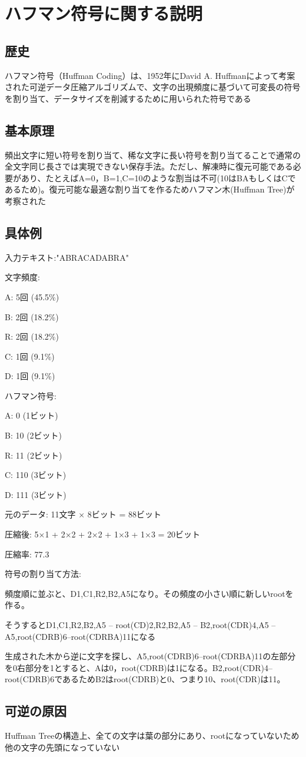 \section{ハフマン符号に関する説明}
\subsection{歴史}
    \label{sec:Sec1Implementation}
ハフマン符号（Huffman Coding）は、1952年にDavid A. Huffmanによって考案された可逆データ圧縮アルゴリズムで、文字の出現頻度に基づいて可変長の符号を割り当て、データサイズを削減するために用いられた符号である
\subsection{基本原理}
頻出文字に短い符号を割り当て、稀な文字に長い符号を割り当てることで通常の全文字同じ長さでは実現できない保存手法。ただし、解凍時に復元可能である必要があり、たとえばA=0，B=1,C=10のような割当は不可(10はBAもしくはCであるため)。復元可能な最適な割り当てを作るためハフマン木(Huffman Tree)が考察された
\subsection{具体例}

入力テキスト:"ABRACADABRA"

文字頻度:

A: 5回 (45.5\%)

B: 2回 (18.2\%) 

R: 2回 (18.2\%)

C: 1回 (9.1\%)

D: 1回 (9.1\%)

ハフマン符号:

A: 0     (1ビット)

B: 10    (2ビット)

R: 11    (2ビット)

C: 110   (3ビット)

D: 111   (3ビット)

元のデータ: 11文字 × 8ビット = 88ビット

圧縮後: 5×1 + 2×2 + 2×2 + 1×3 + 1×3 = 20ビット

圧縮率: 77.3%


符号の割り当て方法:

頻度順に並ぶと、D1,C1,R2,B2,A5になり。その頻度の小さい順に新しいrootを作る。

そうするとD1,C1,R2,B2,A5 -- root(CD)2,R2,B2,A5 -- B2,root(CDR)4,A5 -- A5,root(CDRB)6--root(CDRBA)11になる

生成された木から逆に文字を探し、A5,root(CDRB)6--root(CDRBA)11の左部分を0右部分を1とすると、Aは0，root(CDRB)は1になる。B2,root(CDR)4--root(CDRB)6であるためB2はroot(CDRB)と0、つまり10、root(CDR)は11。

\subsection{可逆の原因}
Huffman Treeの構造上、全ての文字は葉の部分にあり、rootになっていないため他の文字の先頭になっていない
